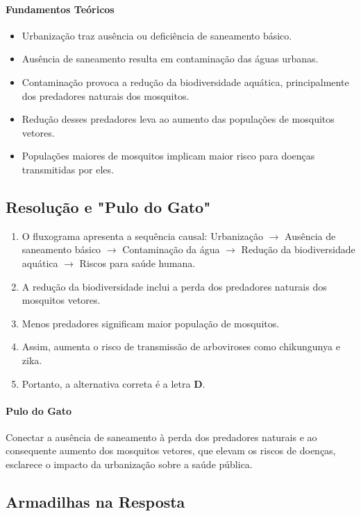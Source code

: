 \documentclass{article}
\begin{document}
\paragraph{Fundamentos Teóricos}
\begin{itemize}
  \item Urbanização traz ausência ou deficiência de saneamento básico.
  \item Ausência de saneamento resulta em contaminação das águas urbanas.
  \item Contaminação provoca a redução da biodiversidade aquática, principalmente dos predadores naturais dos mosquitos.
  \item Redução desses predadores leva ao aumento das populações de mosquitos vetores.
  \item Populações maiores de mosquitos implicam maior risco para doenças transmitidas por eles.
\end{itemize}

\subsection*{Resolução e "Pulo do Gato"}

\begin{enumerate}
  \item O fluxograma apresenta a sequência causal: Urbanização $\to$ Ausência de saneamento básico $\to$ Contaminação da água $\to$ Redução da biodiversidade aquática $\to$ Riscos para saúde humana.
  \item A redução da biodiversidade inclui a perda dos predadores naturais dos mosquitos vetores.
  \item Menos predadores significam maior população de mosquitos.
  \item Assim, aumenta o risco de transmissão de arboviroses como chikungunya e zika.
  \item Portanto, a alternativa correta é a letra \textbf{D}.
\end{enumerate}

\paragraph{Pulo do Gato}
Conectar a ausência de saneamento à perda dos predadores naturais e ao consequente aumento dos mosquitos vetores, que elevam os riscos de doenças, esclarece o impacto da urbanização sobre a saúde pública.

\subsection*{Armadilhas na Resposta}
\end{document}
